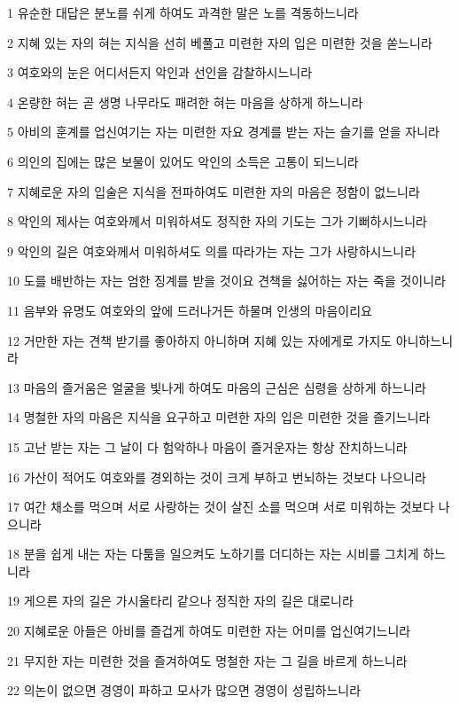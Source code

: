 \par 1 유순한 대답은 분노를 쉬게 하여도 과격한 말은 노를 격동하느니라
\par 2 지혜 있는 자의 혀는 지식을 선히 베풀고 미련한 자의 입은 미련한 것을 쏟느니라
\par 3 여호와의 눈은 어디서든지 악인과 선인을 감찰하시느니라
\par 4 온량한 혀는 곧 생명 나무라도 패려한 혀는 마음을 상하게 하느니라
\par 5 아비의 훈계를 업신여기는 자는 미련한 자요 경계를 받는 자는 슬기를 얻을 자니라
\par 6 의인의 집에는 많은 보물이 있어도 악인의 소득은 고통이 되느니라
\par 7 지혜로운 자의 입술은 지식을 전파하여도 미련한 자의 마음은 정함이 없느니라
\par 8 악인의 제사는 여호와께서 미워하셔도 정직한 자의 기도는 그가 기뻐하시느니라
\par 9 악인의 길은 여호와께서 미워하셔도 의를 따라가는 자는 그가 사랑하시느니라
\par 10 도를 배반하는 자는 엄한 징계를 받을 것이요 견책을 싫어하는 자는 죽을 것이니라
\par 11 음부와 유명도 여호와의 앞에 드러나거든 하물며 인생의 마음이리요
\par 12 거만한 자는 견책 받기를 좋아하지 아니하며 지혜 있는 자에게로 가지도 아니하느니라
\par 13 마음의 즐거움은 얼굴을 빛나게 하여도 마음의 근심은 심령을 상하게 하느니라
\par 14 명철한 자의 마음은 지식을 요구하고 미련한 자의 입은 미련한 것을 즐기느니라
\par 15 고난 받는 자는 그 날이 다 험악하나 마음이 즐거운자는 항상 잔치하느니라
\par 16 가산이 적어도 여호와를 경외하는 것이 크게 부하고 번뇌하는 것보다 나으니라
\par 17 여간 채소를 먹으며 서로 사랑하는 것이 살진 소를 먹으며 서로 미워하는 것보다 나으니라
\par 18 분을 쉽게 내는 자는 다툼을 일으켜도 노하기를 더디하는 자는 시비를 그치게 하느니라
\par 19 게으른 자의 길은 가시울타리 같으나 정직한 자의 길은 대로니라
\par 20 지혜로운 아들은 아비를 즐겁게 하여도 미련한 자는 어미를 업신여기느니라
\par 21 무지한 자는 미련한 것을 즐겨하여도 명철한 자는 그 길을 바르게 하느니라
\par 22 의논이 없으면 경영이 파하고 모사가 많으면 경영이 성립하느니라
